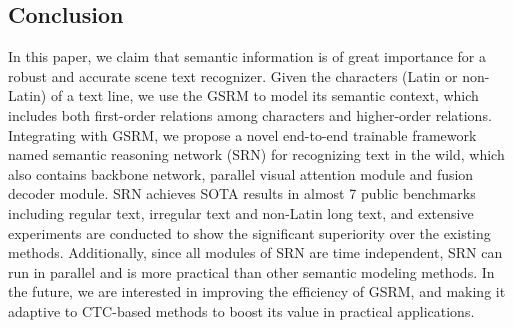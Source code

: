 \documentclass[10pt,twocolumn,letterpaper]{article}
\begin{document}
\begin{CJK}{UTF8}{gbsn}
\section{Conclusion}
In this paper, we claim that semantic information is of great importance for a robust and accurate scene text recognizer.
Given the characters (Latin or non-Latin) of a text line, we use the GSRM to model its semantic context, which includes both first-order relations among characters and higher-order relations.
Integrating with GSRM, we propose a novel end-to-end trainable framework named semantic reasoning network (SRN) for recognizing text in the wild, which also contains backbone network, parallel visual attention module and fusion decoder module. 
SRN achieves SOTA results in almost 7 public benchmarks including regular text, irregular text and non-Latin long text, and extensive experiments are conducted to show the significant superiority over the existing methods. 
Additionally, since all modules of SRN are time independent, SRN can run in parallel and is more practical than other semantic modeling methods. 
In the future, we are interested in improving the efficiency of GSRM, and making it adaptive to CTC-based methods to boost its value in practical applications.



{\small


}
\end{CJK}
\end{document}
